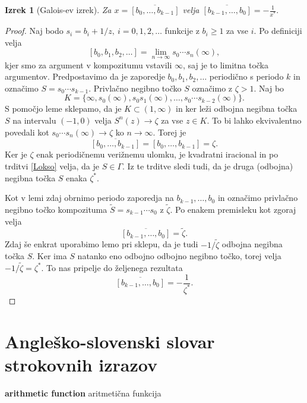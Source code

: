 \documentclass[a4paper,12pt]{article}
\newcommand{\geslo}[2]{\noindent\textbf{#1} \quad \hangindent=1cm #2\\[-1pc]}
\newtheorem*{izrek}{Izrek}
\newenvironment{dokaz}[1][Dokaz]{\begin{proof}}{\end{proof}}
\begin{document}
\begin{izrek}[Galois-ev izrek]
	Za $x = \overline{[b_0, \ldots, b_{k-1}]}$ velja $\overline{[b_{k-1}, \ldots, b_0]} = - \frac{1}{x^*}.$
\end{izrek}


\begin{dokaz}
    Naj bodo $s_i = b_i + 1/z,\ i = 0, 1, 2, \ldots$ funkcije z $b_i \geq 1$ za vse $i$. Po definiciji velja
    \[
        [b_0, b_1, b_2, \ldots] = \lim_{n \to \infty} s_0\cdots s_n (\infty),   
    \]
    kjer smo za argument v kompozitumu vstavili $\infty$, saj je to limitna točka argumentov. Predpostavimo da je zaporedje $b_0, b_1, b_2, \ldots$ periodično s periodo $k$ in označimo $S = s_0\cdots s_{k-1}$. Privlačno negibno točko $S$ označimo z $\zeta > 1$. Naj bo
    \[
        K = \{ \infty, s_0(\infty), s_0s_1(\infty), \ldots, s_0\cdots s_{k-2}(\infty)\}.
    \]
    S pomočjo leme sklepamo, da je $K \subset (1, \infty)$ in ker leži odbojna negibna točka $S$ na intervalu $(-1, 0)$ velja $S^n(z) \to \zeta$ za vse $z \in K$. To bi lahko ekvivalentno povedali kot $s_0\cdots s_n(\infty) \to \zeta$ ko $n \to \infty$. Torej je
    \[
        \overline{[b_0, \ldots, b_{k-1}]} = [b_0, \ldots, b_{k-1}] = \zeta.
    \]
    Ker je $\zeta$ enak periodičnemu verižnemu ulomku, je kvadratni iracional in po trditvi \ref{Lokso} velja, da je $S \in \Gamma$. Iz te trditve sledi tudi, da je druga (odbojna) negibna točka $S$ enaka $\zeta^*$.

    Kot v lemi zdaj obrnimo periodo zaporedja na $b_{k-1}, \ldots, b_0$ in označimo privlačno negibno točko kompozituma $\tilde{S} = s_{k-1}\cdots s_0$ z $\tilde{\zeta}$. Po enakem premisleku kot zgoraj velja
    \[
        \overline{[b_{k-1}, \ldots, b_0]} = \tilde{\zeta}.
    \]
    Zdaj še enkrat uporabimo lemo pri sklepu, da je tudi $- 1 / \tilde{\zeta}$ odbojna negibna točka $S$. Ker ima $S$ natanko eno odbojno odbojno negibno točko, torej velja $- 1 / \tilde{\zeta} = \zeta^*$. To nas pripelje do željenega rezultata
    \[
        \overline{[b_{k-1}, \ldots, b_0]} = - \frac{1}{\zeta^*}.
    \]
\end{dokaz}
\newpage


\section*{Angleško-slovenski slovar strokovnih izrazov}


\geslo{arithmetic function}{aritmetična funkcija}
\end{document}
